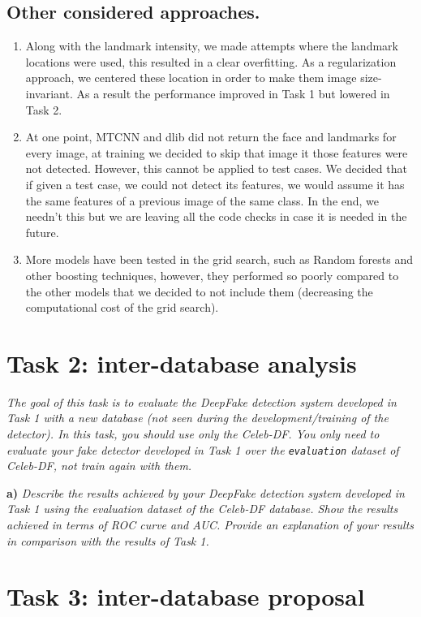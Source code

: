 \documentclass[11pt]{article}
\begin{document}
\subsection*{Other considered approaches.}

\begin{enumerate}
  \item Along with the landmark intensity, we made attempts where the landmark locations were used, this resulted in a clear overfitting. As a regularization approach, we centered these location in order to make them image size-invariant. As a result the performance improved in Task 1 but lowered in Task 2.
  \item At one point, MTCNN and dlib did not return the face and landmarks for every image, at training we decided to skip that image it those features were not detected. However, this cannot be applied to test cases. We decided that if given a test case, we could not detect its features, we would assume it has the same features of a previous image of the same class. In the end, we needn't this but we are leaving all the code checks in case it is needed in the future.
  \item More models have been tested in the grid search, such as Random forests and other boosting techniques, however, they performed so poorly compared to the other models that we decided to not include them (decreasing the computational cost of the grid search).
\end{enumerate}

\section*{Task 2: inter-database analysis}

\textit{The goal of this task is to evaluate the DeepFake detection system developed in Task 1 with a new database (not seen during the development/training of the detector). In this task, you should use only the Celeb-DF. You only need to evaluate your fake detector developed in Task 1 over the \texttt{evaluation} dataset of Celeb-DF, not train again with them.}

\textbf{a)} \textit{Describe the results achieved by your DeepFake detection system developed in Task 1 using the evaluation dataset of the Celeb-DF database. Show the results achieved in terms of ROC curve and AUC. Provide an explanation of your results in comparison with the results of Task 1.}

\section*{Task 3: inter-database proposal}
\end{document}
